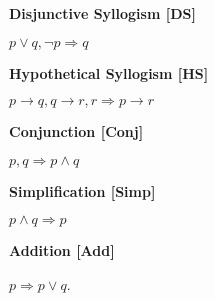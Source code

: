\documentclass[12pt, a4paper]{article}
\begin{document}
\begin{flushleft}
\begin{description}
    \item \bullet \textbf{ Disjunctive Syllogism [DS]}\par\hspace{15mm}
    $p\vee q,\neg p\Rightarrow q$
    
    \item \bullet \textbf{ Hypothetical Syllogism [HS]}\par\hspace{15mm}
    $p\to q,q\to r, r\Rightarrow p\to r$
    
    \item \bullet \textbf{ Conjunction [Conj]}\par\hspace{15mm}
    $p,q\Rightarrow p\wedge q$
    
    \item \bullet \textbf{ Simplification [Simp]}\par\hspace{15mm}
    $p\wedge q\Rightarrow p$
    
    \item \bullet \textbf{ Addition [Add]}\par\hspace{15mm}
    $p\Rightarrow p\vee q$.


\end{description}

\end{flushleft}

\newpage
\end{document}
